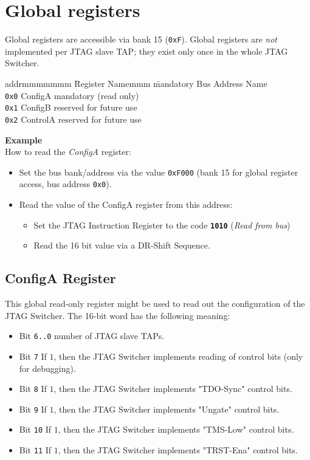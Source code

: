 \documentclass[10pt,english,a4paper]{report}
\begin{document}
\newpage
\section{Global registers}
Global registers are accessible via bank 15 ({\tt 0xF}). Global registers are {\em not}
implemented per JTAG slave TAP; they exist only once in the whole JTAG Switcher.
\begin{tabbing}
addrmmmmmmm \= Register Namemmm \= mandatory \kill
Bus Address \> Name \> \\
{\tt 0x0} \> ConfigA  \> mandatory (read only) \\
{\tt 0x1} \> ConfigB  \> reserved  for future use \\
{\tt 0x2} \> ControlA \> reserved  for future use \\
\end{tabbing}
{\bf Example}\\
How to read the {\em ConfigA} register:
\begin{itemize}
\item Set the bus bank/address via the value {\tt 0xF000}
      (bank 15 for global register access, bus address {\tt 0x0}).
\item Read the value of the ConfigA register from this address:
\begin{itemize}
\item Set the JTAG Instruction Register to the code {\tt\bf 1010} ({\em Read from bus})
\item Read the 16 bit value via a DR-Shift Sequence.
\end{itemize}
\end{itemize}

\subsection{ConfigA Register}
This global read-only register might be used to read out the configuration of the
JTAG Switcher. The 16-bit word has the following meaning:
\begin{itemize}
\item Bit {\tt 6..0} number of JTAG slave TAPs.
\item Bit {\tt  7} If $1$, then the JTAG Switcher implements reading of control bits (only for debugging).
\item Bit {\tt  8} If $1$, then the JTAG Switcher implements "TDO-Sync" control bits.
\item Bit {\tt  9} If $1$, then the JTAG Switcher implements "Ungate" control bits.
\item Bit {\tt 10} If $1$, then the JTAG Switcher implements "TMS-Low" control bits.
\item Bit {\tt 11} If $1$, then the JTAG Switcher implements "TRST-Ena" control bits.
\end{itemize}
\end{document}
